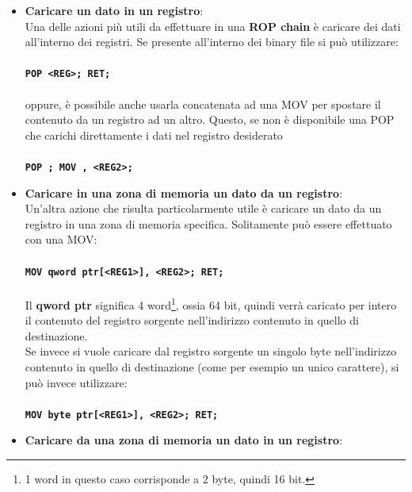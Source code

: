 \begin{itemize}
    \item \textbf{Caricare un dato in un registro}:\\
        Una delle azioni più utili da effettuare in una \textbf{ROP chain} è caricare dei dati all'interno dei registri. Se presente all'interno dei binary file si può utilizzare:\\
        \\\texttt{\large{\textbf{\textcolor{Bittersweet}{POP}  \space  <REG>; \space \textcolor{Bittersweet}{RET};}}}\\\\
        oppure, è possibile anche usarla concatenata ad una MOV per spostare il contenuto da un registro ad un altro. Questo, se non è disponibile una POP che carichi direttamente i dati nel registro desiderato\\
        \\\texttt{\large{\textbf{\textcolor{Bittersweet}{POP}  ; \space \textcolor{Bittersweet}{MOV}  , <REG2>;}}}
    \item \textbf{Caricare in una zona di memoria un dato da un registro}:\\
        Un'altra azione che risulta particolarmente utile è caricare un dato da un registro in una zona di memoria specifica. Solitamente può essere effettuato con una MOV:\\
        \\\texttt{\large{\textbf{\textcolor{Bittersweet}{MOV}  \space  qword ptr[<REG1>], <REG2>; \space \textcolor{Bittersweet}{RET};}}}\\\\
        Il \textbf{qword ptr} significa 4 word\footnote[1]{1 word in questo caso corrisponde a 2 byte, quindi 16 bit.}, ossia 64 bit, quindi verrà caricato per intero il contenuto del registro sorgente nell'indirizzo contenuto in quello di destinazione.\\
        Se invece si vuole caricare dal registro sorgente un singolo byte nell'indirizzo contenuto in quello di destinazione (come per esempio un unico carattere), si può invece utilizzare:\\
        \\\texttt{\large{\textbf{\textcolor{Bittersweet}{MOV}  \space  byte ptr[<REG1>], <REG2>; \space \textcolor{Bittersweet}{RET};}}}\\
    \item \textbf{Caricare da una zona di memoria un dato in un registro}:\\

\end{itemize}
